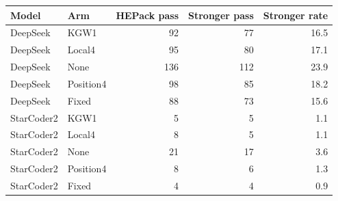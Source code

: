 \begin{tabular}{llrrr}
\toprule
Model & Arm & HEPack pass & Stronger pass & Stronger rate \\
\midrule
DeepSeek & KGW1 & 92 & 77 & 16.5 \\
DeepSeek & Local4 & 95 & 80 & 17.1 \\
DeepSeek & None & 136 & 112 & 23.9 \\
DeepSeek & Position4 & 98 & 85 & 18.2 \\
DeepSeek & Fixed & 88 & 73 & 15.6 \\
StarCoder2 & KGW1 & 5 & 5 & 1.1 \\
StarCoder2 & Local4 & 8 & 5 & 1.1 \\
StarCoder2 & None & 21 & 17 & 3.6 \\
StarCoder2 & Position4 & 8 & 6 & 1.3 \\
StarCoder2 & Fixed & 4 & 4 & 0.9 \\
\bottomrule
\end{tabular}
